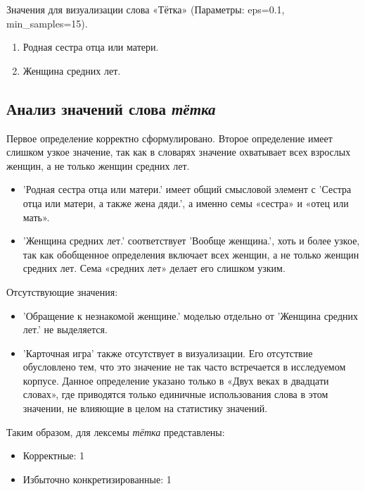 Значения для визуализации слова «Тётка» (Параметры: eps=0.1, min\_samples=15).

\begin{enumerate}
    \item Родная сестра отца или матери.
    \item Женщина средних лет.
\end{enumerate}

\subsection*{Анализ значений слова \textit{тётка}}

Первое определение корректно сформулировано.
Второе определение имеет слишком узкое значение, так как в словарях значение охватывает всех взрослых женщин,
а не только женщин средних лет.

\begin{itemize}
    \item ’Родная сестра отца или матери.’ имеет общий смысловой элемент с
’Сестра отца или матери, а также жена дяди.’, а именно семы «сестра» и «отец или мать».

    \item ’Женщина средних лет.’ соответствует ’Вообще женщина.’, хоть и более узкое,
так как обобщенное определения включает всех женщин, а не только женщин средних лет.
Сема «средних лет» делает его слишком узким.
\end{itemize}

Отсутствующие значения:
\begin{itemize}
    \item ’Обращение к незнакомой женщине.’ моделью отдельно от ’Женщина средних лет.’ не выделяется.

    \item ’Карточная игра’ также отсутствует в визуализации.
Его отсутствие обусловлено тем, что это значение не так часто встречается в исследуемом корпусе.
Данное определение указано только в «Двух веках в двадцати словах», где приводятся только
единичные использования слова в этом значении, не влияющие в целом на статистику значений.
\end{itemize}

Таким образом, для лексемы \textit{тётка} представлены:

\begin{itemize}
    \item Корректные: 1
    \item Избыточно конкретизированные: 1
\end{itemize}

